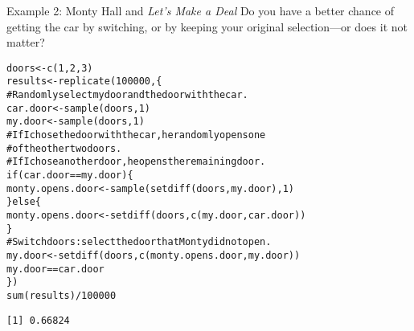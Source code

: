 \documentclass{beamer}\usepackage[]{graphicx}\usepackage[]{color}
\makeatletter
\newcommand{\hlnum}[1]{\textcolor[rgb]{0.824,0.412,0.118}{#1}}%
\newcommand{\hlcom}[1]{\textcolor[rgb]{0.824,0.706,0.549}{#1}}%
\newcommand{\hlopt}[1]{\textcolor[rgb]{1,0.894,0.769}{#1}}%
\newcommand{\hlstd}[1]{\textcolor[rgb]{1,0.894,0.769}{#1}}%
\newcommand{\hlkwa}[1]{\textcolor[rgb]{0.941,0.902,0.549}{#1}}%
\newcommand{\hlkwb}[1]{\textcolor[rgb]{0.804,0.776,0.451}{#1}}%
\newcommand{\hlkwd}[1]{\textcolor[rgb]{1,0.78,0.769}{#1}}%
\newenvironment{kframe}{%
 \def\at@end@of@kframe{}%
 \ifinner\ifhmode%
  \def\at@end@of@kframe{\end{minipage}}%
  \begin{minipage}{\columnwidth}%
 \fi\fi%
 \def\FrameCommand##1{\hskip\@totalleftmargin \hskip-\fboxsep
 \colorbox{shadecolor}{##1}\hskip-\fboxsep
     \hskip-\linewidth \hskip-\@totalleftmargin \hskip\columnwidth}%
 \MakeFramed {\advance\hsize-\width
   \@totalleftmargin\z@ \linewidth\hsize
   \@setminipage}}%
 {\par\unskip\endMakeFramed%
 \at@end@of@kframe}
\newenvironment{knitrout}{}{} %
\makeatother
\begin{document}
\begin{darkframes}
    \begin{frame}{Example 2: Monty Hall and \emph{Let's Make a Deal}}
      Do you have a better chance of getting the car by switching, or by keeping your original selection---or does it not matter?
      \lc
    \end{frame}

    \begin{frame}[fragile]
      \fontsize{10}{10}\selectfont
\begin{knitrout}
\begin{kframe}
\begin{alltt}
\hlstd{doors} \hlkwb{<-} \hlkwd{c}\hlstd{(}\hlnum{1}\hlstd{,} \hlnum{2}\hlstd{,} \hlnum{3}\hlstd{)}
\hlstd{results} \hlkwb{<-} \hlkwd{replicate}\hlstd{(}\hlnum{100000}\hlstd{, \{}
  \hlcom{# Randomly select my door and the door with the car.}
  \hlstd{car.door} \hlkwb{<-} \hlkwd{sample}\hlstd{(doors,} \hlnum{1}\hlstd{)}
  \hlstd{my.door} \hlkwb{<-} \hlkwd{sample}\hlstd{(doors,} \hlnum{1}\hlstd{)}
  \hlcom{# If I chose the door with the car, he randomly opens one}
  \hlcom{#   of the other two doors.}
  \hlcom{# If I chose another door, he opens the remaining door.}
  \hlkwa{if} \hlstd{(car.door} \hlopt{==} \hlstd{my.door) \{}
    \hlstd{monty.opens.door} \hlkwb{<-} \hlkwd{sample}\hlstd{(}\hlkwd{setdiff}\hlstd{(doors, my.door),} \hlnum{1}\hlstd{)}
  \hlstd{\}} \hlkwa{else} \hlstd{\{}
    \hlstd{monty.opens.door} \hlkwb{<-} \hlkwd{setdiff}\hlstd{(doors,} \hlkwd{c}\hlstd{(my.door, car.door))}
  \hlstd{\}}
  \hlcom{# Switch doors: select the door that Monty did not open.}
  \hlstd{my.door} \hlkwb{<-} \hlkwd{setdiff}\hlstd{(doors,} \hlkwd{c}\hlstd{(monty.opens.door, my.door))}
  \hlstd{my.door} \hlopt{==} \hlstd{car.door}
\hlstd{\})}
\hlkwd{sum}\hlstd{(results)} \hlopt{/} \hlnum{100000}
\end{alltt}
\begin{verbatim}
[1] 0.66824
\end{verbatim}
\end{kframe}
\end{knitrout}
      \lc
    \end{frame}


\end{darkframes}
\end{document}
